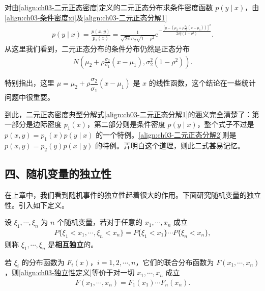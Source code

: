 \documentclass[../../main.tex]{subfiles}
\begin{document}
\begin{example}[二元正态的条件分布]\label{example:ch03-二元正态条件分布}
对由\eqref{align:ch03-二元正态密度}定义的二元正态分布求条件密度函数 $p(y\mid x)$，由\eqref{align:ch03-条件密度xi}及\eqref{align:ch03-二元正态分解1}
\begin{align}
p(y\mid x)=\frac{p(x,y)}{p_1(x)}
=\frac{1}{\sqrt{2\pi}\sigma_2\sqrt{1-\rho^{2}}}\mathrm{e}^{-\frac{\left[y-\left(\mu_2+\rho\frac{\sigma_2}{\sigma_1}(x-\mu_1)\right)\right]^{2}}{2\sigma_2^{2}(1-\rho^{2})}}.\label{align:ch03-二元正态条件密度}
\end{align}
从这里我们看到，二元正态分布的条件分布仍然是正态分布
\begin{align}
N\!\left(\mu_2+\rho\frac{\sigma_2}{\sigma_1}(x-\mu_1),\sigma_2^{2}(1-\rho^{2})\right).\label{align:ch03-二元正态条件分布}
\end{align}

特别指出，这里 $\mu=\mu_2+\rho\dfrac{\sigma_2}{\sigma_1}(x-\mu_1)$ 是 $x$ 的线性函数，这个结论在一些统计问题中很重要。
\end{example}

到此，二元正态密度典型分解式\eqref{align:ch03-二元正态分解1}的涵义完全清楚了：第一部分是边际密度 $p_1(x)$，第二部分则是条件密度 $p(y\mid x)$，整个式子不过是 $p(x,y)=p_1(x)p(y\mid x)$ 的一个特例。\eqref{align:ch03-二元正态分解2}则是 $p(x,y)=p_2(y)p(x\mid y)$ 的特例。弄明白这个道理，则此二式甚易记忆。

\subsection*{四、随机变量的独立性}

在上章中，我们看到随机事件的独立性起着很大的作用。下面研究随机变量的独立性。引入如下定义。

\begin{definition}[随机变量的独立性]\label{definition:ch03-随机变量独立性}
设 $\xi_1,\cdots,\xi_n$ 为 $n$ 个随机变量，若对于任意的 $x_1,\cdots,x_n$ 成立
\begin{align}
P\{\xi_1<x_1,\cdots,\xi_n<x_n\}=P\{\xi_1<x_1\}\cdots P\{\xi_n<x_n\},\label{align:ch03-独立性定义}
\end{align}
则称 $\xi_1,\cdots,\xi_n$ 是\textbf{相互独立}的。
\end{definition}

若 $\xi_i$ 的分布函数为 $F_i(x)$，$i=1,2,\cdots,n$，它们的联合分布函数为 $F(x_1,\cdots,x_n)$，则\eqref{align:ch03-独立性定义}等价于对一切 $x_1,\cdots,x_n$ 成立
\begin{align}
F(x_1,\cdots,x_n)=F_1(x_1)\cdots F_n(x_n).\label{align:ch03-独立性分布函数}
\end{align}
\end{document}
